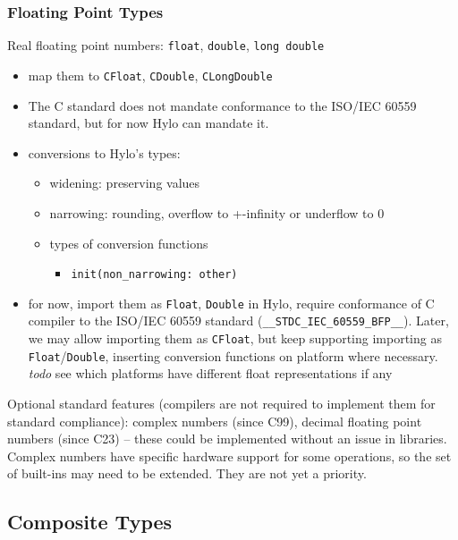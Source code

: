 \subsubsection{Floating Point Types}
Real floating point numbers: \texttt{float}, \texttt{double}, \texttt{long double}
\begin{itemize}
    \item map them to \texttt{CFloat}, \texttt{CDouble}, \texttt{CLongDouble}
    \item The C standard does not mandate conformance to the ISO/IEC 60559 standard, but for now Hylo can mandate it. 
    \item conversions to Hylo's types:
        \begin{itemize}
            \item widening: preserving values
            \item narrowing: rounding, overflow to +-infinity or underflow to 0
            \item types of conversion functions
                \begin{itemize}
                    \item \texttt{init(non\_narrowing: other)}
                \end{itemize}
        \end{itemize}
    \item for now, import them as \texttt{Float}, \texttt{Double} in Hylo, require conformance of C compiler to the ISO/IEC 60559 standard (\texttt{\_\_STDC\_IEC\_60559\_BFP\_\_}). Later, we may allow importing them as \texttt{CFloat}, but keep supporting importing as \texttt{Float}/\texttt{Double}, inserting conversion functions on platform where necessary. \textit{todo} see which platforms have different float representations if any
\end{itemize}
Optional standard features (compilers are not required to implement them for standard compliance): complex numbers (since C99), decimal floating point numbers (since C23) -- these could be implemented without an issue in libraries. Complex numbers have specific hardware support for some operations, so the set of built-ins may need to be extended. They are not yet a priority.

\subsection{Composite Types}

